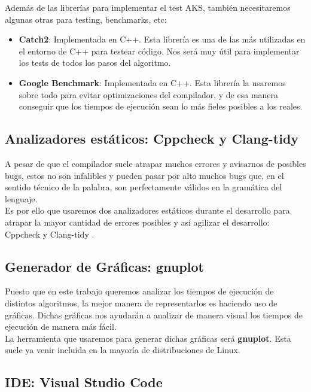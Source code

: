 Además de las librerías para implementar el test AKS, también necesitaremos algunas otras para testing, benchmarks, etc:

\begin{itemize}
	\item \textbf{Catch2}: Implementada en C++. Esta librería es una de las más utilizadas en el entorno de C++ para testear código. Nos será muy útil para implementar los tests de todos los pasos del algoritmo.
	
	\item \textbf{Google Benchmark}: Implementada en C++. Esta librería la usaremos sobre todo para evitar optimizaciones del compilador, y de esa manera conseguir que los tiempos de ejecución sean lo más fieles posibles a los reales.
\end{itemize}

\subsection{Analizadores estáticos: Cppcheck y Clang-tidy}

A pesar de que el compilador suele atrapar muchos errores y avisarnos de posibles bugs, estos no son infalibles y pueden pasar por alto muchos bugs que, en el sentido técnico de la palabra, son perfectamente válidos en la gramática del lenguaje.\\

Es por ello que usaremos dos analizadores estáticos durante el desarrollo para atrapar la mayor cantidad de errores posibles y así agilizar el desarrollo: Cppcheck \cite{cppcheck} y Clang-tidy \cite{clang_tidy}.

\subsection{Generador de Gráficas: gnuplot}

Puesto que en este trabajo queremos analizar los tiempos de ejecución de distintos algoritmos, la mejor manera de representarlos es haciendo uso de gráficas. Dichas gráficas nos ayudarán a analizar de manera visual los tiempos de ejecución de manera más fácil.\\

La herramienta que usaremos para generar dichas gráficas será \textbf{gnuplot}. Esta suele ya venir incluida en la mayoría de distribuciones de Linux.

\subsection{IDE: Visual Studio Code}

